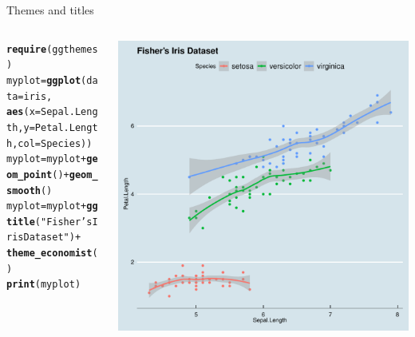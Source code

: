 \documentclass[aspectratio=169]{beamer}\usepackage[]{graphicx}\usepackage[]{color}
\makeatletter
\def\maxwidth{ %
  \ifdim\Gin@nat@width>\linewidth
    \linewidth
  \else
    \Gin@nat@width
  \fi
}
\newcommand{\hlstr}[1]{\textcolor[rgb]{0.192,0.494,0.8}{#1}}%
\newcommand{\hlopt}[1]{\textcolor[rgb]{0,0,0}{#1}}%
\newcommand{\hlstd}[1]{\textcolor[rgb]{0.345,0.345,0.345}{#1}}%
\newcommand{\hlkwb}[1]{\textcolor[rgb]{0.69,0.353,0.396}{#1}}%
\newcommand{\hlkwc}[1]{\textcolor[rgb]{0.333,0.667,0.333}{#1}}%
\newcommand{\hlkwd}[1]{\textcolor[rgb]{0.737,0.353,0.396}{\textbf{#1}}}%
\newenvironment{kframe}{%
 \def\at@end@of@kframe{}%
 \ifinner\ifhmode%
  \def\at@end@of@kframe{\end{minipage}}%
  \begin{minipage}{\columnwidth}%
 \fi\fi%
 \def\FrameCommand##1{\hskip\@totalleftmargin \hskip-\fboxsep
 \colorbox{shadecolor}{##1}\hskip-\fboxsep
     \hskip-\linewidth \hskip-\@totalleftmargin \hskip\columnwidth}%
 \MakeFramed {\advance\hsize-\width
   \@totalleftmargin\z@ \linewidth\hsize
   \@setminipage}}%
 {\par\unskip\endMakeFramed%
 \at@end@of@kframe}
\newenvironment{knitrout}{}{} %
\makeatother
\begin{document}
\begin{frame}[fragile]{Themes and titles}
\begin{columns}
  \begin{column}{0.50\textwidth}
\begin{knitrout}\tiny
{}\color{fgcolor}\begin{kframe}
\begin{alltt}
\hlkwd{require}\hlstd{(ggthemes)}
\hlstd{myplot} \hlkwb{=} \hlkwd{ggplot}\hlstd{(}\hlkwc{data}\hlstd{=iris,}
                \hlkwd{aes}\hlstd{(}\hlkwc{x}\hlstd{=Sepal.Length,} \hlkwc{y}\hlstd{=Petal.Length,} \hlkwc{col}\hlstd{=Species))}
\hlstd{myplot} \hlkwb{=} \hlstd{myplot} \hlopt{+} \hlkwd{geom_point}\hlstd{()} \hlopt{+} \hlkwd{geom_smooth}\hlstd{()}
\hlstd{myplot} \hlkwb{=} \hlstd{myplot} \hlopt{+} \hlkwd{ggtitle}\hlstd{(}\hlstr{"Fisher's Iris Dataset"}\hlstd{)} \hlopt{+}
  \hlkwd{theme_economist}\hlstd{()}
\hlkwd{print}\hlstd{(myplot)}
\end{alltt}
\end{kframe}
\end{knitrout}
  \end{column}
  \begin{column}{0.5\textwidth}
\begin{knitrout}\scriptsize
{}\color{fgcolor}
\includegraphics[width=\maxwidth]{figure/unnamed-chunk-15-1} 

\end{knitrout}
  \end{column}
\end{columns}
\end{frame}
\end{document}
